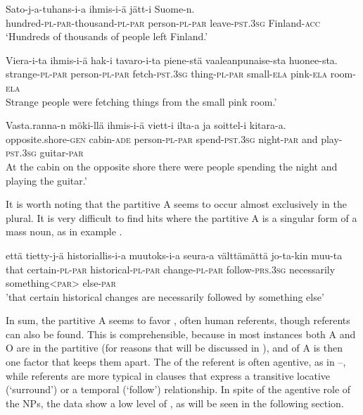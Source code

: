 \documentclass[output=paper]{LSP/langsci}
\begin{document}
\ea\label{15-hu-ex:16}
\gll Sato-j-a-tuhans-i-a ihmis-i-ä jätt-i Suome-n.\\
hundred-\textsc{pl}-\textsc{par}-thousand-\textsc{pl}-\textsc{par} person-\textsc{pl}-\textsc{par} leave-\textsc{pst}.\textsc{3sg} Finland-\textsc{acc}\\
\glt ‘Hundreds of thousands of people left Finland.’%
\z

\ea\label{15-hu-ex:17}
\gll Viera-i-ta ihmis-i-ä hak-i tavaro-i-ta piene-stä vaaleanpunaise-sta huonee-sta.\\
strange-\textsc{pl}-\textsc{par} person-\textsc{pl}-\textsc{par} fetch-\textsc{pst}.\textsc{3sg} thing-\textsc{pl}-\textsc{par} small-\textsc{ela} pink-\textsc{ela} room-\textsc{ela}\\
\glt Strange people were fetching things from the small pink room.’ %
\z

\ea\label{15-hu-ex:18}
\gll Vasta.ranna-n möki-llä ihmis-i-ä viett-i ilta-a ja soittel-i kitara-a.\\
opposite.shore-\textsc{gen} cabin-\textsc{ade} person-\textsc{pl}-\textsc{par} spend-\textsc{pst}.\textsc{3sg} night-\textsc{par} and play-\textsc{pst}.\textsc{3sg} guitar-\textsc{par}\\
\glt At the cabin on the opposite shore there were people spending the night and playing the guitar.’ 
\z

It is worth noting that the partitive A seems to occur almost exclusively in the plural. It is very difficult to find hits where the partitive A is a singular form of a mass noun, as in  example . 

\ea\label{15-hu-ex:19}
\gll että tietty-j-ä historiallis-i-a muutoks-i-a seura-a välttämättä jo-ta-kin muu-ta\\
that certain-\textsc{pl}-\textsc{par} historical-\textsc{pl}-\textsc{par} change-\textsc{pl}-\textsc{par} follow-\textsc{prs}.\textsc{3sg} necessarily something<\textsc{par}> else-\textsc{par}\\
\glt 'that certain historical changes are necessarily followed by something else’
\z

In sum, the partitive A seems to favor , often human referents, though  referents can also be found. This is comprehensible, because in most instances both A and O are in the partitive (for reasons that will be discussed in ), and  of A is then one factor that keeps them apart. The  of the  referent is often agentive, as in --, while  referents are more typical in clauses that express a transitive locative (\eg ‘surround’) or a temporal (\eg ‘follow’) relationship. In spite of the agentive role of the  NPs, the data show a low level of , as will be seen in the following section. 
\end{document}
